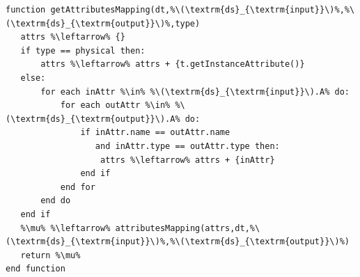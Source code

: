 \begin{minipage}[c]{0.95\textwidth}
\begin{lstlisting}[language=pseudocode,label={lst:algorithm-attribute-mappings},caption={[Obtenção de múltiplos mapeamentos de atributos]Obtenção de múltiplos mapeamentos de atributos entre dois conjuntos de dados.}]
function getAttributesMapping(dt,%\(\textrm{ds}_{\textrm{input}}\)%,%\(\textrm{ds}_{\textrm{output}}\)%,type)
   attrs %\leftarrow% {}
   if type == physical then:
       attrs %\leftarrow% attrs + {t.getInstanceAttribute()}
   else:
       for each inAttr %\in% %\(\textrm{ds}_{\textrm{input}}\).A% do:
           for each outAttr %\in% %\(\textrm{ds}_{\textrm{output}}\).A% do:
               if inAttr.name == outAttr.name
                  and inAttr.type == outAttr.type then:
                   attrs %\leftarrow% attrs + {inAttr}
               end if
           end for
       end do
   end if
   %\mu% %\leftarrow% attributesMapping(attrs,dt,%\(\textrm{ds}_{\textrm{input}}\)%,%\(\textrm{ds}_{\textrm{output}}\)%)
   return %\mu%
end function
\end{lstlisting}
\end{minipage}


